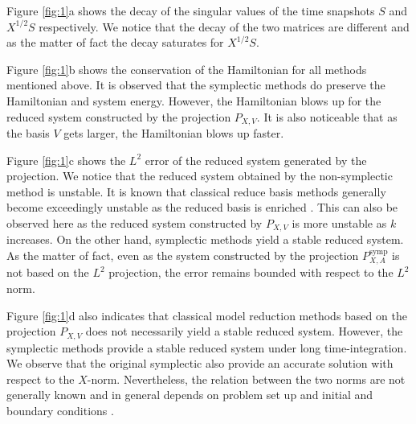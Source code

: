 Figure \ref{fig:1}a shows the decay of the singular values of the time snapshots $S$ and $X^{1/2}S$ respectively. We notice that the decay of the two matrices are different and as the matter of fact the decay saturates for $X^{1/2}S$.

Figure \ref{fig:1}b shows the conservation of the Hamiltonian for all methods mentioned above. It is observed that the symplectic methods do preserve the Hamiltonian and system energy. However, the Hamiltonian blows up for the reduced system constructed by the projection $P_{X,V}$. It is also noticeable that as the basis $V$ gets larger, the Hamiltonian blows up faster.

Figure \ref{fig:1}c shows the $L^2$ error of the reduced system generated by the projection. We notice that the reduced system obtained by the non-symplectic method is unstable. It is known that classical reduce basis methods generally become exceedingly unstable as the reduced basis is enriched . This can also be observed here as the reduced system constructed by $P_{X,V}$ is more unstable as $k$ increases. On the other hand, symplectic methods yield a stable reduced system. As the matter of fact, even as the system constructed by the projection $P^{\text{symp}}_{X,A}$ is not based on the $L^2$ projection, the error remains bounded with respect to the $L^2$ norm. 

Figure \ref{fig:1}d also indicates that classical model reduction methods based on the projection $P_{X,V}$ does not necessarily yield a stable reduced system. However, the symplectic methods provide a stable reduced system under long time-integration. We observe that the original symplectic also provide an accurate solution with respect to the $X$-norm. Nevertheless, the relation between the two norms are not generally known and in general depends on problem set up and initial and boundary conditions \cite{DEPARIS20094359}.

